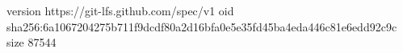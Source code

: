 version https://git-lfs.github.com/spec/v1
oid sha256:6a1067204275b711f9dcdf80a2d16bfa0e5e35fd45ba4eda446c81e6edd92c9c
size 87544
